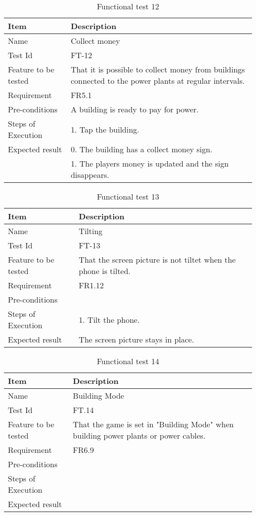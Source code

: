 \begin{table}[H]
\centering
	\begin{tabular}{ l | p{8cm} }
		\hline
		{\bf Item} & {\bf Description} \\ \hline
		Name & Collect money \\ 
		Test Id & FT-12 \\ 
		Feature to be tested & That it is possible to collect money from buildings connected to the power plants at regular intervals. \\
		Requirement & FR5.1 \\ 
		Pre-conditions & A building is ready to pay for power. \\ 
		Steps of Execution & 1. Tap the building. \\ 
		Expected result & 0. The building has a collect money sign. \\
		& 1. The players money is updated and the sign disappears. \\
	\end{tabular}
	\caption{Functional test 12}
\end{table}

\begin{table}[H]
\centering
	\begin{tabular}{ l | p{8cm} }
		\hline
		{\bf Item} & {\bf Description} \\ \hline
		Name & Tilting \\ 
		Test Id & FT-13 \\ 
		Feature to be tested & That the screen picture is not tiltet when the phone is tilted. \\ 
		Requirement & FR1.12 \\ 
		Pre-conditions & \\ 
		Steps of Execution & 1. Tilt the phone. \\ 
		Expected result & The screen picture stays in place. \\ 
	\end{tabular}
	\caption{Functional test 13}
\end{table}

\begin{table}[H]
\centering
	\begin{tabular}{ l | p{8cm} }
		\hline
		{\bf Item} & {\bf Description} \\ \hline
		Name & Building Mode \\ 
		Test Id & FT.14 \\ 
		Feature to be tested & That the game is set in "Building Mode" when building power plants or power cables. \\ 
		Requirement & FR6.9 \\ 
		Pre-conditions &  \\ 
		Steps of Execution &  \\ 
		Expected result & \\ 
	\end{tabular}
	\caption{Functional test 14}
\end{table}

